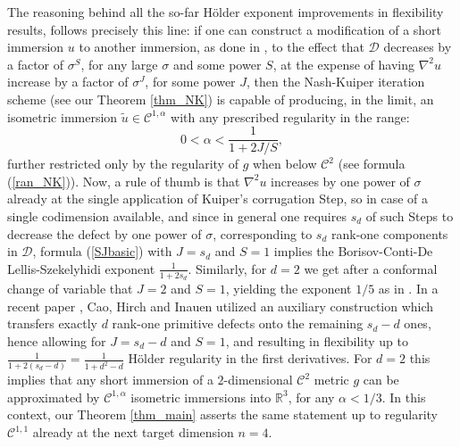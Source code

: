 \documentclass[reqno,twoside,11pt]{amsart}
\newcommand{\R}{\mathbb{R}}
\numberwithin{equation}{section}
\theoremstyle{plain}
\theoremstyle{definition}
\begin{document}
\medskip

The reasoning behind all the so-far H\"older exponent
improvements in flexibility results, follows precisely this line: if one can construct a modification
of a short immersion $u$ to another immersion, as done in \cite{Nash2,
Kuiper}, to the effect that $\mathcal{D}$ decreases by a factor of $\sigma^S$, for any large
$\sigma$ and some power $S$, at the expense of having 
$\nabla^2u$ increase by a factor of $\sigma^J$, for some
power $J$, then the Nash-Kuiper iteration scheme (see our
Theorem \ref{thm_NK}) is capable of producing, in the limit, an isometric immersion 
$\tilde u\in\mathcal{C}^{1,\alpha}$ with any prescribed regularity in
the range:
\begin{equation}\label{SJbasic}
0< \alpha < \frac{1}{1+2J/S},
\end{equation}
further restricted only by the regularity of $g$ when below
$\mathcal{C}^2$ (see formula (\ref{ran_NK})). Now, a rule of thumb is
that $\nabla^2u$ increases 
by one power of $\sigma$ already at the single application of
Kuiper's corrugation Step, so in case of a single codimension
available, and since in general one requires $s_d$ of such
Steps to decrease the defect by one power of $\sigma$, corresponding
to $s_d$ rank-one components in $\mathcal{D}$, formula (\ref{SJbasic}) with
$J=s_d$ and $S=1$ implies the Borisov-Conti-De Lellis-Szekelyhidi
exponent $\frac{1}{1+2s_d}$. Similarly, for $d=2$ we get after a
conformal change of variable that $J=2$ and $S=1$,
yielding the exponent $1/5$ as in \cite{DIS1/5}. 
In a recent paper \cite{CHI2}, Cao, Hirch and Inauen utilized
an auxiliary construction which transfers exactly $d$ rank-one primitive
defects onto the remaining
$s_d-d$ ones, hence allowing for $J=s_d-d$ and $S=1$, and resulting in
flexibility up to $\frac{1}{1+2(s_d-d)} =
\frac{1}{1+d^2-d}$ H\"older regularity in the first derivatives. 
For $d=2$ this implies that any short immersion of a $2$-dimensional
$\mathcal{C}^2$ metric $g$ can be approximated by $\mathcal{C}^{1,\alpha}$ isometric
immersions into $\R^3$, for any $\alpha<1/3$. In
this context, our Theorem \ref{thm_main} asserts the same statement up
to regularity $\mathcal{C}^{1,1}$ already at the next target
dimension $n=4$.

\medskip
\end{document}
